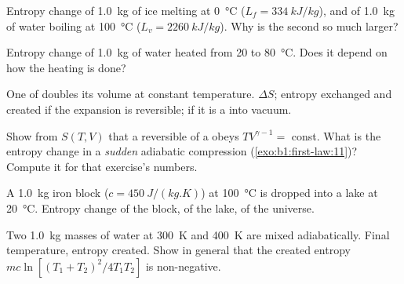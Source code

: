 \begin{exercise}[$\star$]\label{exo:b1:second-law-entropy:1}
Entropy change of \qty{1.0}{kg} of ice melting at \qty{0}{\degreeCelsius}
($L_f = \qty{334}{kJ/kg}$), and of \qty{1.0}{kg} of water boiling at
\qty{100}{\degreeCelsius} ($L_v = \qty{2260}{kJ/kg}$). Why is the second so
much larger?
\end{exercise}

\begin{exercise}[$\star$]\label{exo:b1:second-law-entropy:2}
Entropy change of \qty{1.0}{kg} of water heated from \qty{20}{} to
\qty{80}{\degreeCelsius}. Does it depend on how the heating is done?
\end{exercise}

\begin{exercise}[$\star$]\label{exo:b1:second-law-entropy:3}
One  of  doubles its volume at constant temperature.
$\Delta S$; entropy exchanged and created if the expansion is reversible;
if it is a  into vacuum.
\end{exercise}

\begin{exercise}[$\star$]\label{exo:b1:second-law-entropy:4}
Show from $S(T, V)$ that a reversible  of a
 obeys $TV^{\gamma - 1} = $ const. What is the entropy change in
a \emph{sudden} adiabatic compression (\cref{exo:b1:first-law:11})?
Compute it for that exercise's numbers.
\end{exercise}

\begin{exercise}[$\star\star$]\label{exo:b1:second-law-entropy:5}
A \qty{1.0}{kg} iron block ($c = \qty{450}{J/(kg.K)}$) at \qty{100}{\degreeCelsius}
is dropped into a lake at \qty{20}{\degreeCelsius}. Entropy change of the
block, of the lake, of the universe.
\end{exercise}

\begin{exercise}[$\star\star$]\label{exo:b1:second-law-entropy:6}
Two \qty{1.0}{kg} masses of water at \qty{300}{K} and \qty{400}{K} are mixed
adiabatically. Final temperature, entropy created. Show in general that
the created entropy $mc\ln[(T_1 + T_2)^2/4T_1T_2]$ is non-negative.
\end{exercise}


